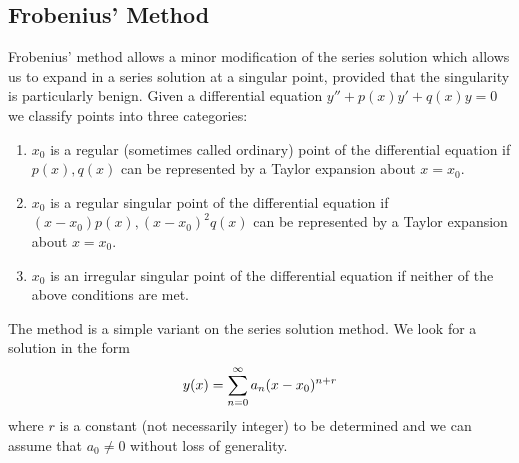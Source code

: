 \documentclass[10pt, a4paper]{article}
\begin{document}
\subsection{Frobenius' Method}
Frobenius' method allows a minor modification of the series solution which allows us to expand in a series solution at a singular point,
provided that the singularity is particularly benign.
Given a differential equation $y'' + p(x)y' + q(x)y = 0$ we classify points into three categories:
\begin{enumerate}[label = (\roman*)]
    \item $x_0$ is a regular
    (sometimes called ordinary)
    point of the differential equation if $p(x), q(x)$ can be represented by a Taylor expansion about $x = x_0$.

    \item $x_0$ is a regular singular point of the differential equation if $(x - x_0)p(x), (x - x_0) ^ 2q(x)$ can be represented by a Taylor expansion about $x = x_0$.

    \item $x_0$ is an irregular singular point of the differential equation if neither of the above conditions are met.
\end{enumerate}

The method is a simple variant on the series solution method.
We look for a solution in the form
\[
y(x) = \infsum[n = 0]a_n(x - x_0) ^ {n + r}
\]
where $r$ is a constant
(not necessarily integer)
to be determined and we can assume that $a_0 \neq 0$ without loss of generality.
\end{document}
